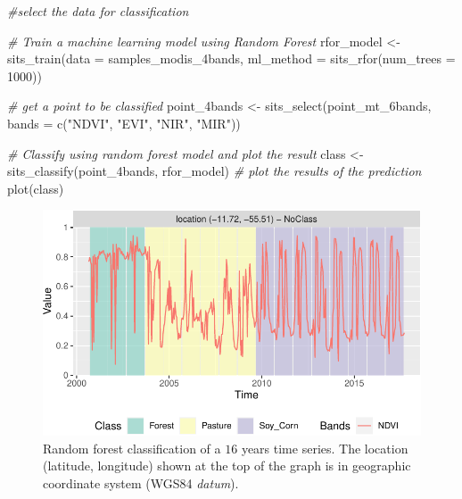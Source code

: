 \documentclass[a4paper,]{tufte-book}
\newenvironment{Shaded}{}{}
\newcommand{\AttributeTok}[1]{\textcolor[rgb]{0.49,0.56,0.16}{#1}}
\newcommand{\CommentTok}[1]{\textcolor[rgb]{0.38,0.63,0.69}{\textit{#1}}}
\newcommand{\DecValTok}[1]{\textcolor[rgb]{0.25,0.63,0.44}{#1}}
\newcommand{\FunctionTok}[1]{\textcolor[rgb]{0.02,0.16,0.49}{#1}}
\newcommand{\NormalTok}[1]{#1}
\newcommand{\OtherTok}[1]{\textcolor[rgb]{0.00,0.44,0.13}{#1}}
\newcommand{\StringTok}[1]{\textcolor[rgb]{0.25,0.44,0.63}{#1}}
\begin{document}
\begin{Shaded}
\begin{Highlighting}[]
\CommentTok{\#select the data for classification}

\CommentTok{\# Train a machine learning model using Random Forest}
\NormalTok{rfor\_model }\OtherTok{\textless{}{-}} \FunctionTok{sits\_train}\NormalTok{(}\AttributeTok{data =}\NormalTok{ samples\_modis\_4bands, }
                    \AttributeTok{ml\_method =} \FunctionTok{sits\_rfor}\NormalTok{(}\AttributeTok{num\_trees =} \DecValTok{1000}\NormalTok{))}

\CommentTok{\# get a point to be classified}
\NormalTok{point\_4bands }\OtherTok{\textless{}{-}} \FunctionTok{sits\_select}\NormalTok{(point\_mt\_6bands, }
                            \AttributeTok{bands =} \FunctionTok{c}\NormalTok{(}\StringTok{"NDVI"}\NormalTok{, }\StringTok{"EVI"}\NormalTok{, }\StringTok{"NIR"}\NormalTok{, }\StringTok{"MIR"}\NormalTok{))}

\CommentTok{\# Classify using random forest model and plot the result}
\NormalTok{class }\OtherTok{\textless{}{-}} \FunctionTok{sits\_classify}\NormalTok{(point\_4bands, rfor\_model)}
\CommentTok{\# plot the results of the prediction}
\FunctionTok{plot}\NormalTok{(class)}
\end{Highlighting}
\end{Shaded}

\begin{figure}

{\centering \includegraphics[width=0.7\linewidth]{sitsbook_files/figure-latex/unnamed-chunk-12-1} 

}

\caption[Random forest classification of a $16$ years time series]{Random forest classification of a $16$ years time series. The location (latitude, longitude) shown at the top of the graph is in geographic coordinate system (WGS84 {\it datum}).}\label{fig:unnamed-chunk-12}
\end{figure}
\end{document}
